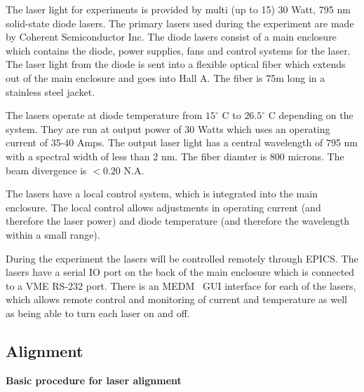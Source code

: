 {The laser light for experiments is provided by multi (up to 15) 30 Watt, 795
nm solid-state diode lasers.  The primary lasers used during the
experiment are made by Coherent Semiconductor Inc. 
The diode lasers consist of a main enclosure which contains the diode,
power supplies, fans and control systems for the laser.  The laser
light from the diode is sent into a flexible optical fiber which
extends out of the main enclosure and goes into Hall A. 
The fiber is 75m long in a stainless steel jacket.

The lasers operate at diode temperature from $15^{\circ}$ C to
$26.5^{\circ}$ C depending on the system.  They are run at output
power of 30 Watts which uses an operating current of 35-40 Amps.  The
output laser light has a central wavelength of 795 nm with a spectral
width of less than 2 nm. The fiber diamter is 800 microns.  The beam
divergence is $< 0.20$ N.A.

The lasers have a local control system, which is integrated into the
main enclosure.  The local control allows adjustments in operating
current (and therefore the laser power) and diode temperature (and
therefore the wavelength within a small range).

During the experiment the lasers will be controlled remotely through
 EPICS.  The lasers have a serial IO port on the back of the main
 enclosure which is connected to a VME RS-232 port.  There is an
 MEDM~\cite{MEDMwww} GUI interface for each of the lasers, which
 allows remote control and monitoring of current and temperature as
 well as being able to turn each laser on and off.


\subsection{Alignment}

\noindent
{\bf{Basic procedure for laser alignment}}


}
